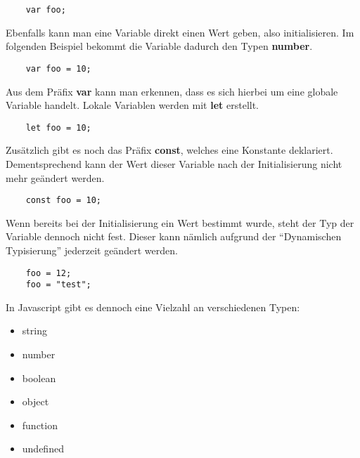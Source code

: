 \begin{lstlisting}
    var foo;
\end{lstlisting}
\newpage
Ebenfalls kann man eine Variable direkt einen Wert geben, also initialisieren. Im folgenden Beispiel bekommt die Variable dadurch den Typen \textbf{number}.

\begin{lstlisting}
    var foo = 10;
\end{lstlisting}

Aus dem Präfix \textbf{var} kann man erkennen, dass es sich hierbei um eine globale Variable handelt. Lokale Variablen werden mit \textbf{let} erstellt.

\begin{lstlisting}
    let foo = 10;
\end{lstlisting}

Zusätzlich gibt es noch das Präfix \textbf{const}, welches eine Konstante deklariert. Dementsprechend kann der Wert dieser Variable nach der Initialisierung nicht mehr geändert werden.

\begin{lstlisting}
    const foo = 10;
\end{lstlisting}

Wenn bereits bei der Initialisierung ein Wert bestimmt wurde, steht der Typ der Variable dennoch nicht fest. Dieser kann nämlich aufgrund der “Dynamischen Typisierung” jederzeit geändert werden.

\begin{lstlisting}
    foo = 12;
    foo = "test";
\end{lstlisting}

In Javascript gibt es dennoch eine Vielzahl an verschiedenen Typen:

\begin{itemize}
  \item string
  \item number
  \item boolean
  \item object
  \item function
  \item undefined
\end{itemize}

\cite{frontend_web_javascript}
\newpage